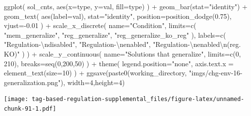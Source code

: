 \documentclass[
]{book}
\newenvironment{Shaded}{\begin{snugshade}}{\end{snugshade}}
\newcommand{\AttributeTok}[1]{\textcolor[rgb]{0.77,0.63,0.00}{#1}}
\newcommand{\DecValTok}[1]{\textcolor[rgb]{0.00,0.00,0.81}{#1}}
\newcommand{\FloatTok}[1]{\textcolor[rgb]{0.00,0.00,0.81}{#1}}
\newcommand{\FunctionTok}[1]{\textcolor[rgb]{0.00,0.00,0.00}{#1}}
\newcommand{\NormalTok}[1]{#1}
\newcommand{\SpecialCharTok}[1]{\textcolor[rgb]{0.00,0.00,0.00}{#1}}
\newcommand{\StringTok}[1]{\textcolor[rgb]{0.31,0.60,0.02}{#1}}
\begin{document}
\begin{Shaded}
\begin{Highlighting}[]
\FunctionTok{ggplot}\NormalTok{( sol\_cnts, }\FunctionTok{aes}\NormalTok{(}\AttributeTok{x=}\NormalTok{type, }\AttributeTok{y=}\NormalTok{val, }\AttributeTok{fill=}\NormalTok{type) ) }\SpecialCharTok{+}
  \FunctionTok{geom\_bar}\NormalTok{(}\AttributeTok{stat=}\StringTok{"identity"}\NormalTok{) }\SpecialCharTok{+}
  \FunctionTok{geom\_text}\NormalTok{(}
    \FunctionTok{aes}\NormalTok{(}\AttributeTok{label=}\NormalTok{val),}
    \AttributeTok{stat=}\StringTok{"identity"}\NormalTok{,}
    \AttributeTok{position=}\FunctionTok{position\_dodge}\NormalTok{(}\FloatTok{0.75}\NormalTok{),}
    \AttributeTok{vjust=}\SpecialCharTok{{-}}\FloatTok{0.01}
\NormalTok{  ) }\SpecialCharTok{+}
  \FunctionTok{scale\_x\_discrete}\NormalTok{(}
    \AttributeTok{name=}\StringTok{"Condition"}\NormalTok{,}
    \AttributeTok{limits=}\FunctionTok{c}\NormalTok{(}
      \StringTok{"mem\_generalize"}\NormalTok{,}
      \StringTok{"reg\_generalize"}\NormalTok{,}
      \StringTok{"reg\_generalize\_ko\_reg"}
\NormalTok{      ),}
    \AttributeTok{labels=}\FunctionTok{c}\NormalTok{(}
      \StringTok{"Regulation{-}}\SpecialCharTok{\textbackslash{}n}\StringTok{disabled"}\NormalTok{,}
      \StringTok{"Regulation{-}}\SpecialCharTok{\textbackslash{}n}\StringTok{enabled"}\NormalTok{,}
      \StringTok{"Regulation{-}}\SpecialCharTok{\textbackslash{}n}\StringTok{enabled}\SpecialCharTok{\textbackslash{}n}\StringTok{(reg. KO)"}
\NormalTok{    )}
\NormalTok{  ) }\SpecialCharTok{+}
  \FunctionTok{scale\_y\_continuous}\NormalTok{(}
    \AttributeTok{name=}\StringTok{"Solutions that generalize"}\NormalTok{,}
    \AttributeTok{limits=}\FunctionTok{c}\NormalTok{(}\DecValTok{0}\NormalTok{, }\DecValTok{210}\NormalTok{),}
    \AttributeTok{breaks=}\FunctionTok{seq}\NormalTok{(}\DecValTok{0}\NormalTok{,}\DecValTok{200}\NormalTok{,}\DecValTok{50}\NormalTok{)}
\NormalTok{  ) }\SpecialCharTok{+}
  \FunctionTok{theme}\NormalTok{(}
    \AttributeTok{legend.position=}\StringTok{"none"}\NormalTok{,}
    \AttributeTok{axis.text.x =} \FunctionTok{element\_text}\NormalTok{(}\AttributeTok{size=}\DecValTok{10}\NormalTok{)}
\NormalTok{  ) }\SpecialCharTok{+}
  \FunctionTok{ggsave}\NormalTok{(}\FunctionTok{paste0}\NormalTok{(working\_directory, }\StringTok{"imgs/chg{-}env{-}16{-}generalization.png"}\NormalTok{), }\AttributeTok{width=}\DecValTok{4}\NormalTok{,}\AttributeTok{height=}\DecValTok{4}\NormalTok{)}
\end{Highlighting}
\end{Shaded}

\texttt{[image: tag-based-regulation-supplemental\_files/figure-latex/unnamed-chunk-91-1.pdf]}
\end{document}
